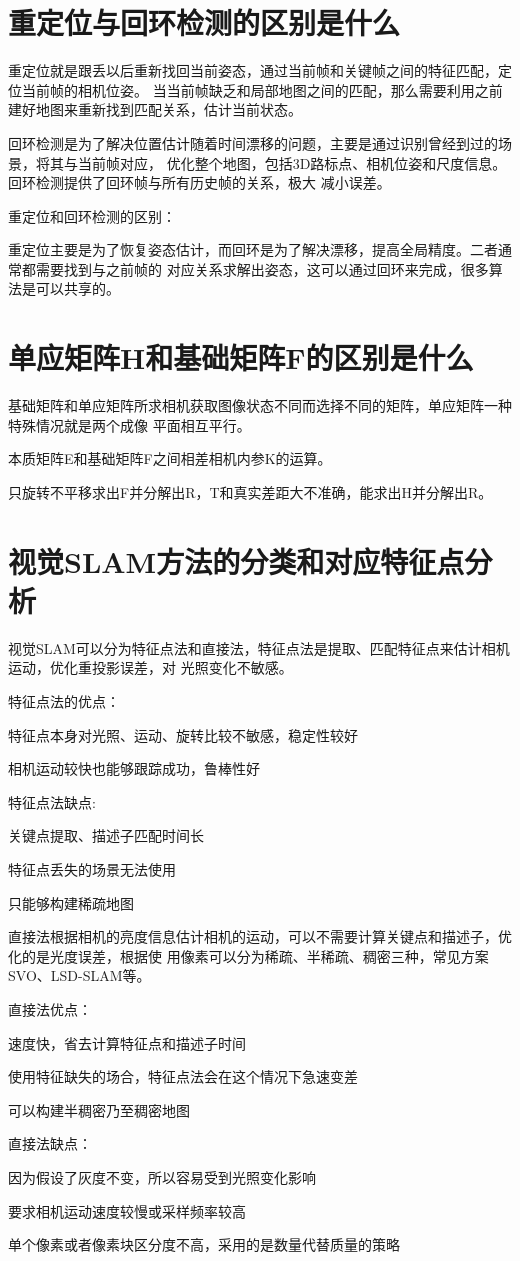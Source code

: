\documentclass[10pt]{article}
\begin{document}
\tableofcontents
{}
\section{重定位与回环检测的区别是什么}
重定位就是跟丢以后重新找回当前姿态，通过当前帧和关键帧之间的特征匹配，定位当前帧的相机位姿。
当当前帧缺乏和局部地图之间的匹配，那么需要利用之前建好地图来重新找到匹配关系，估计当前状态。

回环检测是为了解决位置估计随着时间漂移的问题，主要是通过识别曾经到过的场景，将其与当前帧对应，
优化整个地图，包括3D路标点、相机位姿和尺度信息。回环检测提供了回环帧与所有历史帧的关系，极大
减小误差。

重定位和回环检测的区别：

重定位主要是为了恢复姿态估计，而回环是为了解决漂移，提高全局精度。二者通常都需要找到与之前帧的
对应关系求解出姿态，这可以通过回环来完成，很多算法是可以共享的。
\section{单应矩阵H和基础矩阵F的区别是什么}
基础矩阵和单应矩阵所求相机获取图像状态不同而选择不同的矩阵，单应矩阵一种特殊情况就是两个成像
平面相互平行。

本质矩阵E和基础矩阵F之间相差相机内参K的运算。

只旋转不平移求出F并分解出R，T和真实差距大不准确，能求出H并分解出R。
\section{视觉SLAM方法的分类和对应特征点分析}
视觉SLAM可以分为特征点法和直接法，特征点法是提取、匹配特征点来估计相机运动，优化重投影误差，对
光照变化不敏感。

特征点法的优点：

特征点本身对光照、运动、旋转比较不敏感，稳定性较好

相机运动较快也能够跟踪成功，鲁棒性好

特征点法缺点:

关键点提取、描述子匹配时间长

特征点丢失的场景无法使用

只能够构建稀疏地图

直接法根据相机的亮度信息估计相机的运动，可以不需要计算关键点和描述子，优化的是光度误差，根据使
用像素可以分为稀疏、半稀疏、稠密三种，常见方案SVO、LSD-SLAM等。

直接法优点：

速度快，省去计算特征点和描述子时间

使用特征缺失的场合，特征点法会在这个情况下急速变差

可以构建半稠密乃至稠密地图

直接法缺点：

因为假设了灰度不变，所以容易受到光照变化影响

要求相机运动速度较慢或采样频率较高

单个像素或者像素块区分度不高，采用的是数量代替质量的策略
\end{document}

